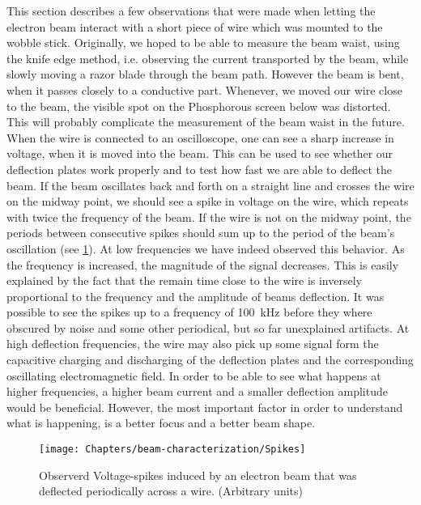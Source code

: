This section describes a few observations that were made when letting the electron beam interact with a short piece of wire which was mounted to the wobble stick. Originally, we hoped to be able to measure the beam waist, using the knife edge method, i.e. observing the current transported by the beam, while slowly moving a razor blade through the beam path. However the beam is bent, when it passes closely to a conductive part. Whenever, we moved our wire close to the beam, the visible spot on the Phosphorous screen below was distorted. This will probably complicate the measurement of the beam waist in the future. 
When the wire is connected to an oscilloscope, one can see a sharp increase in voltage, when it is moved into the beam. This can be used to see whether our deflection plates work properly and to test how fast we are able to deflect the beam. If the beam oscillates back and forth on a straight line and crosses the wire on the midway point, we should see a spike in voltage on the wire, which repeats with twice the frequency of the beam. If the wire is not on the midway point, the periods between consecutive spikes should sum up to the period of the beam's oscillation (see \cref{fig:spikes}). At low frequencies we have indeed observed this behavior. As the frequency is increased, the magnitude of the signal decreases. This is easily explained by the fact that the remain time close to the wire is inversely proportional to the frequency and the amplitude of beams deflection. It was possible to see the spikes up to a frequency of \SI{100}{\kilo\hertz} before they where obscured by noise and some other periodical, but so far unexplained artifacts.
At high deflection frequencies, the wire may also pick up some signal form the capacitive charging and discharging of the deflection plates and the corresponding oscillating electromagnetic field.
In order to be able to see what happens at higher frequencies, a higher beam current and a smaller deflection amplitude would be beneficial. However, the most important factor in order to understand what is happening, is a better focus and a better beam shape.

\begin{figure}
	\centering
	\texttt{[image: Chapters/beam-characterization/Spikes]}
	\caption{Observerd Voltage-spikes induced by an electron beam that was deflected periodically across a wire. (Arbitrary units)}
	\label{fig:spikes}
\end{figure}
